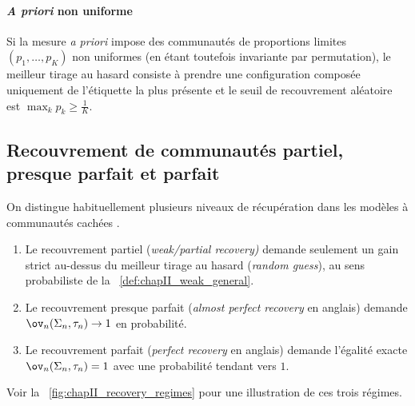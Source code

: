
\paragraph{\emph{A priori} non uniforme}
Si la mesure \emph{a priori} impose des communautés de proportions limites $(p_1,\ldots,p_K)$ non uniformes (en étant toutefois invariante par permutation), le meilleur tirage au hasard consiste à prendre une configuration composée uniquement de l'étiquette la plus présente et le seuil de recouvrement aléatoire est $\max_{k} p_k \ge \frac1K$.

\subsection{Recouvrement de communautés partiel, presque parfait et parfait}

On distingue habituellement plusieurs niveaux de récupération dans les modèles à communautés cachées \cite{Abbe2017,SankararamanBaccelli2018}.
\begin{enumerate}
    \item Le recouvrement partiel (\emph{weak/partial recovery)} demande seulement un gain strict au-dessus du meilleur tirage au hasard (\emph{random guess}), au sens probabiliste de la \Def~\ref{def:chapII_weak_general}.
    \item Le recouvrement presque parfait (\emph{almost perfect recovery} en anglais) demande $\ov_n(\Sigma_n,\tau_n)\to1$ en probabilité.
    \item Le recouvrement parfait (\emph{perfect recovery} en anglais) demande l'égalité exacte $\ov_n(\Sigma_n,\tau_n) = 1$ avec une probabilité tendant vers $1$.
\end{enumerate}
Voir la \Fig~\ref{fig:chapII_recovery_regimes} pour une illustration de ces trois régimes.


